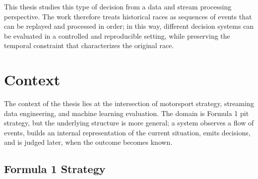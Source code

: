 This thesis studies this type of decision from a data and stream processing perspective. 
The work therefore treats historical races as sequences of events that can be replayed and processed in order; in this way, different
decision systems can be evaluated in a controlled and reproducible setting, while preserving the temporal constraint that characterizes the original race.

\section{Context}

The context of the thesis lies at the intersection of motorsport strategy, streaming data engineering, and machine learning evaluation. The domain is Formula 1 pit
strategy, but the underlying structure is more general; a system observes a flow of events, builds an internal representation of the current situation, emits decisions,
and is judged later, when the outcome becomes known.

\subsection{Formula 1 Strategy}

